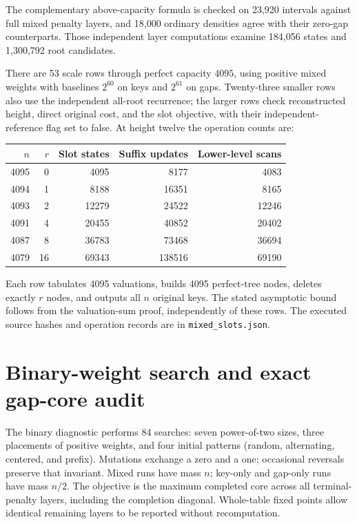 \documentclass[11pt]{article}
\begin{document}
The complementary above-capacity formula is checked on 23,920 intervals
against full mixed penalty layers, and 18,000 ordinary densities agree
with their zero-gap counterparts. Those independent layer computations
examine 184,056 states and 1,300,792 root candidates.

There are 53 scale rows through perfect capacity $4095$, using positive
mixed weights with baselines $2^{60}$ on keys and $2^{61}$ on gaps.
Twenty-three smaller rows also use the independent all-root recurrence;
the larger rows check reconstructed height, direct original cost, and the
slot objective, with their independent-reference flag set to false.
At height twelve the operation counts are:
\begin{center}
\begin{tabular}{rrrrr}
\toprule
$n$ & $r$ & Slot states & Suffix updates & Lower-level scans\\
\midrule
4095 & 0 & 4095 & 8177 & 4083\\
4094 & 1 & 8188 & 16351 & 8165\\
4093 & 2 & 12279 & 24522 & 12246\\
4091 & 4 & 20455 & 40852 & 20402\\
4087 & 8 & 36783 & 73468 & 36694\\
4079 & 16 & 69343 & 138516 & 69190\\
\bottomrule
\end{tabular}
\end{center}
Each row tabulates 4095 valuations, builds 4095 perfect-tree nodes,
deletes exactly $r$ nodes, and outputs all $n$ original keys. The stated
asymptotic bound follows from the valuation-sum proof, independently of
these rows. The executed source hashes and operation records are in
\texttt{mixed\_slots.json}.

\section{Binary-weight search and exact gap-core audit}
\label{app:binary-core}
The binary diagnostic performs 84 searches: seven power-of-two sizes, three
placements of positive weights, and four initial patterns (random,
alternating, centered, and prefix). Mutations exchange a zero and a one;
occasional reversals preserve that invariant. Mixed runs have mass $n$;
key-only and gap-only runs have mass $n/2$. The objective is the maximum
completed core across all terminal-penalty layers, including the completion
diagonal. Whole-table fixed points allow identical remaining layers to be
reported without recomputation.
\end{document}
